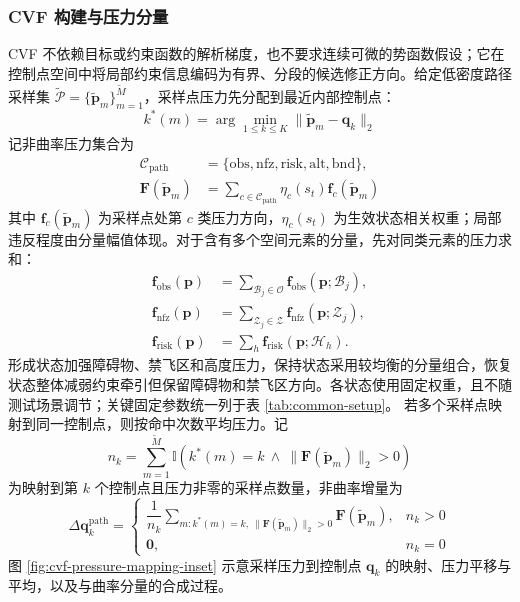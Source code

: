 \subsubsection{CVF 构建与压力分量}

CVF 不依赖目标或约束函数的解析梯度，也不要求连续可微的势函数假设；它在控制点空间中将局部约束信息编码为有界、分段的候选修正方向。给定低密度路径采样集 $\widetilde{\mathcal P}=\{\widetilde{\mathbf p}_m\}_{m=1}^{\widetilde M}$，采样点压力先分配到最近内部控制点：
\begin{equation}
    k^*(m)=\arg\min_{1\leq k\leq K}\|\widetilde{\mathbf p}_m-\mathbf{q}_k\|_2
    \label{eq:nearest-control}
\end{equation}
记非曲率压力集合为
\begin{equation}
    \begin{aligned}
    \mathcal{C}_{\mathrm{path}}
    &=
    \{\mathrm{obs},\mathrm{nfz},\mathrm{risk},\mathrm{alt},\mathrm{bnd}\},\\
    \mathbf F(\widetilde{\mathbf p}_m)
    &=
    \sum_{c\in\mathcal{C}_{\mathrm{path}}}
    \eta_c(s_t)\mathbf f_c(\widetilde{\mathbf p}_m)
    \end{aligned}
    \label{eq:cvf-field}
\end{equation}
其中 $\mathbf f_c(\widetilde{\mathbf p}_m)$ 为采样点处第 $c$ 类压力方向，$\eta_c(s_t)$ 为生效状态相关权重；局部违反程度由分量幅值体现。对于含有多个空间元素的分量，先对同类元素的压力求和：
\begin{equation}
\begin{aligned}
\mathbf f_{\mathrm{obs}}(\mathbf p)&=\sum_{\mathcal B_j\in\mathcal O}\mathbf f_{\mathrm{obs}}(\mathbf p;\mathcal B_j),\\
\mathbf f_{\mathrm{nfz}}(\mathbf p)&=\sum_{\mathcal Z_j\in\mathcal Z}\mathbf f_{\mathrm{nfz}}(\mathbf p;\mathcal Z_j),\\
\mathbf f_{\mathrm{risk}}(\mathbf p)&=\sum_h\mathbf f_{\mathrm{risk}}(\mathbf p;\mathcal H_h).
\end{aligned}
\label{eq:cvf-component-aggregation}
\end{equation}
形成状态加强障碍物、禁飞区和高度压力，保持状态采用较均衡的分量组合，恢复状态整体减弱约束牵引但保留障碍物和禁飞区方向。各状态使用固定权重，且不随测试场景调节；关键固定参数统一列于表 \ref{tab:common-setup}。
若多个采样点映射到同一控制点，则按命中次数平均压力。记
\begin{equation}
    n_k=\sum_{m=1}^{\widetilde M}\mathbb I\!\left(k^*(m)=k\ \land\ \|\mathbf F(\widetilde{\mathbf p}_m)\|_2>0\right)
    \label{eq:cvf-hit-count}
\end{equation}
为映射到第 $k$ 个控制点且压力非零的采样点数量，非曲率增量为
\begin{equation}
    \Delta \mathbf q_k^{\mathrm{path}}=
    \begin{cases}
    \dfrac{1}{n_k}\sum_{m:k^*(m)=k,\ \|\mathbf F(\widetilde{\mathbf p}_m)\|_2>0}\mathbf F(\widetilde{\mathbf p}_m), & n_k>0\\[6pt]
    \mathbf 0, & n_k=0
    \end{cases}
    \label{eq:cvf-average-pressure}
\end{equation}
图 \ref{fig:cvf-pressure-mapping-inset} 示意采样压力到控制点 $\mathbf q_k$ 的映射、压力平移与平均，以及与曲率分量的合成过程。

